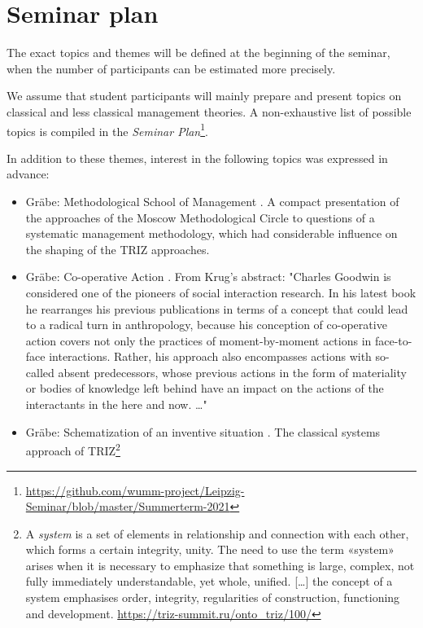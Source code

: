 \documentclass[11pt,a4paper]{article}
\begin{document}
\section{Seminar plan}

The exact topics and themes will be defined at the beginning of the seminar,
when the number of participants can be estimated more precisely.

We assume that student participants will mainly prepare and present topics on
classical and less classical management theories. A non-exhaustive list of
possible topics is compiled in the \emph{Seminar
  Plan}\footnote{\url{https://github.com/wumm-project/Leipzig-Seminar/blob/master/Summerterm-2021}}.

In addition to these themes, interest in the following topics was expressed in
advance:
\begin{itemize}
\item Gr\"abe: Methodological School of Management \cite{Khristenko2014,
  Shchedrovitsky1981}.  A compact presentation of the approaches of the Moscow
  Methodological Circle to questions of a systematic management methodology,
  which had considerable influence on the shaping of the TRIZ approaches.
\item Gr\"abe: Co-operative Action \cite{Goodwin2018, Krug2019}. From Krug's
  abstract: "Charles Goodwin is considered one of the pioneers of social
  interaction research. In his latest book he rearranges his previous
  publications in terms of a concept that could lead to a radical turn in
  anthropology, because his conception of co-operative action covers not only
  the practices of moment-by-moment actions in face-to-face interactions.
  Rather, his approach also encompasses actions with so-called absent
  predecessors, whose previous actions in the form of materiality or bodies of
  knowledge left behind have an impact on the actions of the interactants in
  the here and now. \ldots"
\item Gr\"abe: Schematization of an inventive situation \cite{Kozhemyako2019}.
  The classical systems approach of TRIZ\footnote{A \emph{system} is a set of
    elements in relationship and connection with each other, which forms a
    certain integrity, unity. The need to use the term «system» arises when it
    is necessary to emphasize that something is large, complex, not fully
    immediately understandable, yet whole, unified. [\ldots] the concept of a
    system emphasises order, integrity, regularities of construction,
    functioning and development.  \url{https://triz-summit.ru/onto_triz/100/}}

\end{itemize}
\end{document}
